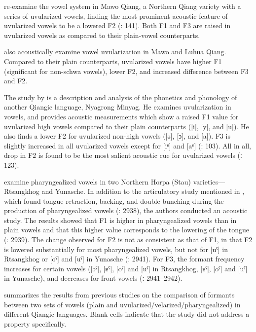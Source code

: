 \documentclass[output=paper]{langscibook}
\begin{document}
\citet{SunEvans2013} re-examine the vowel system in Mawo Qiang, a Northern Qiang variety with a series of uvularized vowels, finding the most prominent acoustic feature of uvularized vowels to be a lowered F2 (\citealt{SunEvans2013}: 141). Both F1 and F3 are raised in uvularized vowels as compared to their plain-vowel counterparts. 

\citet{EvansEtAl2016} also acoustically examine vowel uvularization in Mawo and Luhua Qiang. Compared to their plain counterparts, uvularized vowels have higher F1 (significant for non-schwa vowels), lower F2, and increased difference between F3 and F2. 

The study by \citet{Way2018} is a description and analysis of the phonetics and phonology of another Qiangic language, Nyagrong Minyag. He examines uvularization in vowels, and provides acoustic measurements which show a raised F1 value for uvularized high vowels compared to their plain counterparts ([i], [y], and [u]). He also finds a lower F2 for uvularized non-high vowels ([ə], [ɔ], and [a]). F3 is slightly increased in all uvularized vowels  except for [iʶ] and [aʶ] (\citealt{Way2018}ː 103). All in all, drop in F2 is found to be the most salient acoustic cue for uvularized vowels (\citealt{Way2018}ː 123). 

\citet{ChiuSun2020} examine pharyngealized vowels in two Northern Horpa (Stau) varieties—Rtsangkhog and Yunasche. In addition to the articulatory study mentioned in , which found tongue retraction, backing, and double bunching during the production of pharyngealized vowels (\citealt{ChiuSun2020}: 2938), the authors conducted an acoustic study. The results showed that F1 is higher in pharyngealized vowels than in plain vowels and that this higher value corresponds to the lowering of the tongue (\citealt{ChiuSun2020}ː 2939). The change observed for F2 is not as consistent as that of F1, in that F2 is lowered substantially for most pharyngealized vowels, but not for [uˤ] in Rtsangkhog or [oˤ] and [uˤ] in Yunasche (\citealt{ChiuSun2020}ː 2941). For F3, the formant frequency increases for certain vowels ([əˤ], [ɐˤ], [oˤ] and [uˤ] in Rtsangkhog, [ɐˤ], [oˤ] and [uˤ] in Yunasche), and decreases for front vowels (\citealt{ChiuSun2020}ː 2941--2942).

 summarizes the results from previous studies on the comparison of formants between two sets of vowels (plain and uvularized/velarized/pharyngealized) in different Qiangic languages. Blank cells indicate that the study did not address a property specifically.
\end{document}
